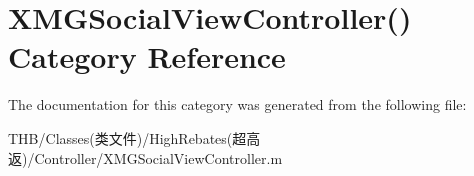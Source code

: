 \hypertarget{category_x_m_g_social_view_controller_07_08}{}\section{X\+M\+G\+Social\+View\+Controller() Category Reference}
\label{category_x_m_g_social_view_controller_07_08}


The documentation for this category was generated from the following file\+:\begin{DoxyCompactItemize}
\item 
T\+H\+B/\+Classes(类文件)/\+High\+Rebates(超高返)/\+Controller/X\+M\+G\+Social\+View\+Controller.\+m\end{DoxyCompactItemize}
